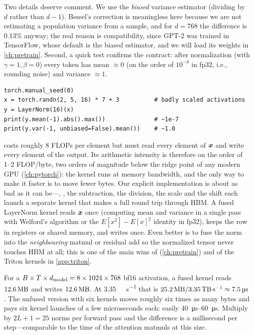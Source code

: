 Two details deserve comment. We use the \emph{biased} variance estimator (dividing by $d$
rather than $d-1$). Bessel's correction is meaningless here because we are not estimating a
population variance from a sample, and for $d=768$ the difference is 0.13\% anyway; the real
reason is compatibility, since GPT-2 was trained in TensorFlow, whose default is the biased
estimator, and we will load its weights in \cref{ch:pretrain}. Second, a quick test confirms the
contract: after normalization (with $\gamma=1,\beta=0$) every token has mean $\approx 0$ (on the
order of $10^{-8}$ in fp32, i.e., rounding noise) and variance $\approx 1$.

\begin{lstlisting}[caption={Checking the normalization contract.},label={lst:gpt:lncheck}]
torch.manual_seed(0)
x = torch.randn(2, 5, 16) * 7 + 3          # badly scaled activations
y = LayerNorm(16)(x)
print(y.mean(-1).abs().max())              # ~1e-7
print(y.var(-1, unbiased=False).mean())    # ~1.0
\end{lstlisting}

\begin{systemslens}
 costs roughly $8$ FLOPs per element but must read every element of
$\bm{x}$ and write every element of the output. Its arithmetic intensity is therefore on the
order of 1--2 FLOP/byte, two orders of magnitude below the ridge point of any modern GPU
(\cref{ch:pytorch}): the kernel runs at memory bandwidth, and the only way to make it faster is to
move fewer bytes. Our explicit implementation is about as bad as it can be---,
, the subtraction, the division, the scale and the shift each launch a separate kernel
that makes a full round trip through HBM. A fused LayerNorm kernel reads $\bm{x}$ once (computing
mean and variance in a single pass with Welford's algorithm or the $E[x^2]-E[x]^2$ identity in
fp32), keeps the row in registers or shared memory, and writes once. Even better is to fuse the
norm into the \emph{neighbouring} matmul or residual add so the normalized tensor never touches
HBM at all; this is one of the main wins of  (\cref{ch:pretrain}) and of the
Triton kernels in \cref{app:triton}.
\end{systemslens}

\begin{napkinmath}
For a $B\times T\times d_{\text{model}} = 8\times1024\times768$ bf16 activation, a fused kernel reads
$\SI{12.6}{\mega\byte}$ and writes $\SI{12.6}{\mega\byte}$. At \SI{3.35}{\tera\byte\per\second}
that is $\SI{25.2}{\mega\byte}/\SI{3.35}{\tera\byte\per\second}\approx\SI{7.5}{\micro\second}$.
The unfused version with six kernels moves roughly six times as many bytes and pays six kernel
launches of a few microseconds each: easily \SIrange{40}{60}{\micro\second}. Multiply by
$2L+1=25$ norms per forward pass and the difference is a millisecond per step---comparable to
the time of the attention matmuls at this size.
\end{napkinmath}

